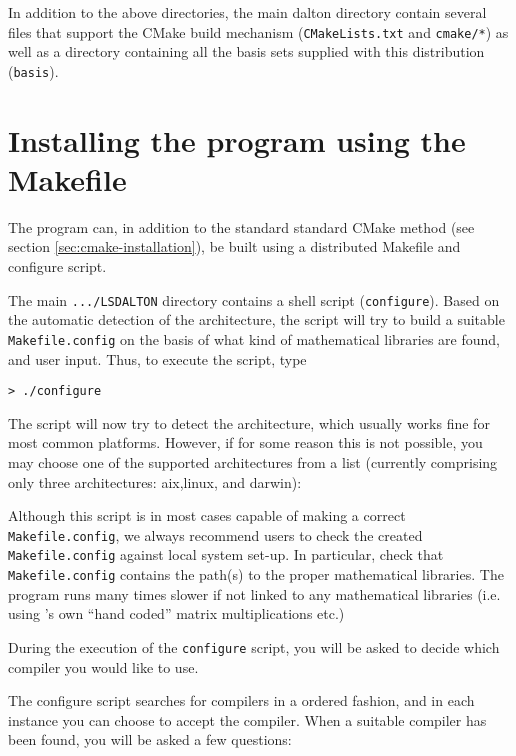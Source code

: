 In addition to the above directories, the main dalton directory contain several
files that support the CMake build mechanism (\verb|CMakeLists.txt| and \verb|cmake/*|) as well as 
a directory containing all the basis sets supplied with this distribution (\verb|basis|).

\section{Installing the program using the Makefile}\label{sec:Makefile}

The {\lsdalton} program can, in addition to the standard 
standard CMake method (see section \ref{sec:cmake-installation}), be
built using a distributed Makefile and configure script.

The main \verb|.../LSDALTON| directory contains a shell script (\verb|configure|).
Based on the automatic detection of the architecture, the
script will try to build a suitable
\verb|Makefile.config| on the
basis of what kind of mathematical libraries are found, and user
input. Thus, to execute the script, type
\begin{verbatim}
> ./configure 
\end{verbatim}

The script will now try to detect the architecture, which usually works fine
for most common platforms. However, if for some reason this is not possible, you
may choose one of the supported architectures from a list (currently comprising
only three architectures: aix,linux, and darwin):

Although this script is in most cases capable of making a correct
\verb|Makefile.config|, we always recommend users to check the created
\verb|Makefile.config| against local system set-up. 
In particular, check that \verb|Makefile.config| contains the path(s)
to the proper mathematical libraries. The program runs many times slower
if not linked to any mathematical libraries (i.e. using {\lsdalton}'s own 
``hand coded'' matrix multiplications etc.)

During the execution of the \verb|configure| script, you will be
asked to decide which compiler you would like to use. 

The configure script searches for compilers in a ordered fashion, and in 
each instance you can choose to accept the compiler. When a suitable compiler has been found, you will be asked a few questions:

